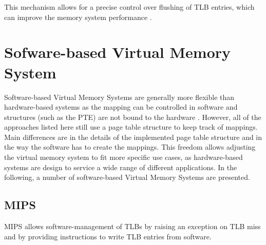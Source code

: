 This mechanism allows for a precise control over flushing of TLB entries, which can improve the
memory system performance \cite{RISCVInstructionSet}.










\section{Sofware-based Virtual Memory System}

Software-based Virtual Memory Systems are generally more flexible than hardware-based systems
as the mapping can be controlled in software and structures (such as the PTE) are not bound
to the hardware \cite{jacob1998virtualissues}.
However, all of the approaches listed here still use a page table structure to keep track of mappings.
Main differences are in the details of the implemented page table structure and in the way the software has to create the mappings. This freedom allows adjusting the virtual memory system to fit more specific use cases, as hardware-based systems are design to service a wide range of different applications\cite{citation needed}.
In the following, a number of software-based Virtual Memory Systems are presented.
\subsection{MIPS}
MIPS \cite{MIPSArchitectureProgrammers2016} allows software-management of TLBs by raising an exception on TLB miss and by providing instructions to write TLB entries from software.

